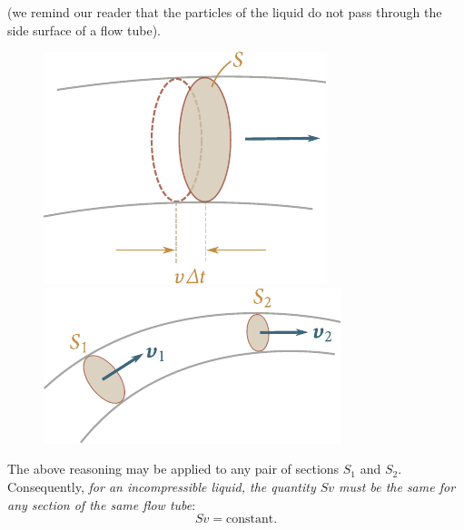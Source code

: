 \noindent
(we remind our reader that the particles of the liquid do not pass through the side surface of a flow tube).

\begin{figure}[t]
	\begin{minipage}[t]{0.5\linewidth}
		\begin{center}
			\includegraphics[scale=1.0]{figures/ch_09/fig_9_2.pdf}
			\caption[]{}
			\label{fig:9_2}
		\end{center}
	\end{minipage}
	\hspace{-0.0cm}
	\begin{minipage}[t]{0.5\linewidth}
		\begin{center}
			\includegraphics[scale=1.0]{figures/ch_09/fig_9_3.pdf}
			\caption[]{}
			\label{fig:9_3}
		\end{center}
	\end{minipage}
	\vspace{-0.0cm}
\end{figure}

The above reasoning may be applied to any pair of sections $S_1$ and $S_2$. Consequently, \textit{for an incompressible liquid, the quantity $Sv$ must be the same for any section of the same flow tube}:
\begin{equation}\label{eq:9_1}
	Sv = \text{constant}.
\end{equation}

